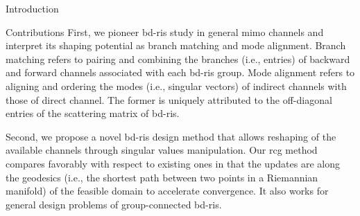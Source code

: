 \documentclass[journal]{IEEEtran}
\begin{document}
\begin{section}{Introduction}
\begin{subsection}{Contributions}
		First, we pioneer \gls{bd}-\gls{ris} study in general \gls{mimo} channels and interpret its shaping potential as branch matching and mode alignment.
		Branch matching refers to pairing and combining the branches (i.e., entries) of backward and forward channels associated with each \gls{bd}-\gls{ris} group.
		Mode alignment refers to aligning and ordering the modes (i.e., singular vectors) of indirect channels with those of direct channel.
		The former is uniquely attributed to the off-diagonal entries of the scattering matrix of \gls{bd}-\gls{ris}.



		Second, we propose a novel \gls{bd}-\gls{ris} design method that allows reshaping of the available channels through singular values manipulation.
		Our \gls{rcg} method compares favorably with respect to existing ones in that the updates are along the geodesics (i.e., the shortest path between two points in a Riemannian manifold) of the feasible domain to accelerate convergence.
		It also works for general design problems of group-connected \gls{bd}-\gls{ris}.




\end{subsection}
\end{section}
\end{document}
